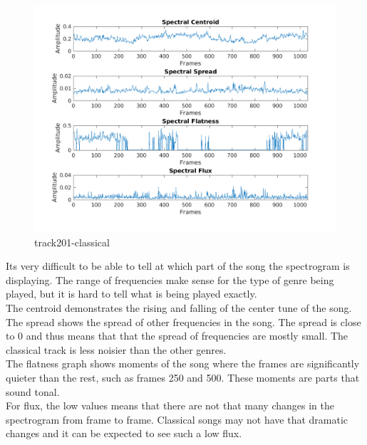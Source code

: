 \documentclass[11pt, a4paper]{article}
\begin{document}
\begin{figure}[H]
    \centering
    \includegraphics[width=\textwidth]{track201-classical-spectral.png}
    \caption{track201-classical}
\end{figure}

Its very difficult to be able to tell at which part of the song the spectrogram is displaying. The range of frequencies make sense for the type of genre being played, but it is hard to tell what is being played exactly. \\

The centroid demonstrates the rising and falling of the center tune of the song. The spread shows the spread of other frequencies in the song. The spread is close to 0 and thus means that that the spread of frequencies are mostly small. The classical track is less noisier than the other genres. \\

The flatness graph shows moments of the song where the frames are significantly quieter than the rest, such as frames 250 and 500. These moments are parts that sound tonal. \\

For flux, the low values means that there are not that many changes in the spectrogram from frame to frame. Classical songs may not have that dramatic changes and it can be expected to see such a low flux. 


\pagebreak
\end{document}
